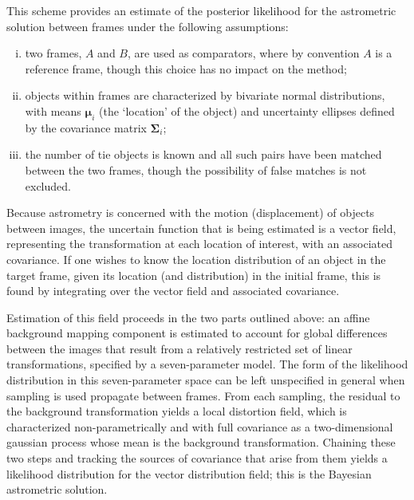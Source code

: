 \documentclass[manuscript]{aastex}
\newcommand{\bsS}{\boldsymbol\Sigma}
\begin{document}
This scheme provides an estimate of the posterior likelihood  for the astrometric solution between frames under the following assumptions: 
\begin{enumerate}[(i)]
\item two frames, $A$ and $B$, are used as comparators, where by convention $A$ is a reference frame, though this choice has no impact on the method;
\item objects within frames are characterized by bivariate normal distributions, with means $\boldsymbol\mu_i$ (the `location' of the object) and uncertainty ellipses defined by the covariance matrix $\boldsymbol\Sigma_i$;
\item the number of tie objects is known and all such pairs have been matched between the two frames, though the possibility of false matches is not excluded.
\end{enumerate}

Because astrometry is concerned with the motion (displacement) of objects between images, the uncertain function that is being estimated is a vector field, representing the transformation at each location of interest, with an associated covariance. If one wishes to know the location distribution of an object in the target frame, given its location (and distribution) in the initial frame, this is found by integrating over the vector field and associated covariance. %

Estimation of this field proceeds in the two parts outlined above: an affine background mapping component is estimated to account for global differences between the images that result from a relatively restricted set of linear transformations, specified by a seven-parameter model. The form of the likelihood distribution in this seven-parameter space can be left unspecified in general when sampling is used propagate between frames. From each sampling, the residual to the background transformation yields a local distortion field, which is characterized non-parametrically and with full covariance as a two-dimensional gaussian process whose mean is the background transformation. Chaining these two steps and tracking the sources of covariance that arise from them yields a likelihood distribution for the vector distribution field; this is the Bayesian astrometric solution.
\end{document}
